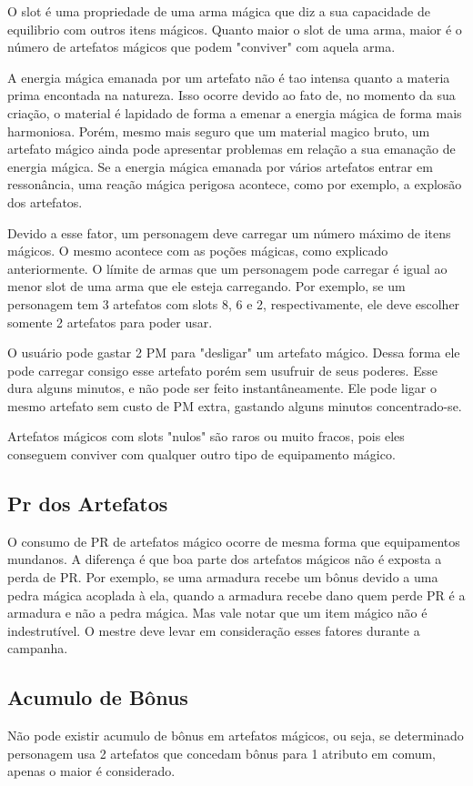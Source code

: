 O slot é uma propriedade de uma arma mágica que diz a sua capacidade de equilibrio com outros itens mágicos. Quanto maior o slot de uma arma, maior é o número de artefatos mágicos que podem "conviver" com aquela arma. 

A energia mágica emanada por um artefato não é tao intensa quanto a materia prima encontada na natureza. Isso ocorre devido ao fato de, no momento da sua criação, o material é lapidado de forma a emenar a energia mágica de forma mais harmoniosa. Porém, mesmo mais seguro que um material magico bruto, um artefato mágico ainda pode apresentar problemas em relação a sua emanação de energia mágica. Se a energia mágica emanada por vários artefatos entrar em ressonância, uma reação mágica perigosa acontece, como por exemplo, a explosão dos artefatos.

Devido a esse fator, um personagem deve carregar um número máximo de itens mágicos. O mesmo acontece com as poções mágicas, como explicado anteriormente. O límite de armas que um personagem pode carregar é igual ao menor slot de uma arma que ele esteja carregando. Por exemplo, se um personagem tem 3 artefatos com slots 8, 6 e 2, respectivamente, ele deve escolher somente 2 artefatos para poder usar.

O usuário pode gastar 2 PM para "desligar" um artefato mágico. Dessa forma ele pode carregar consigo esse artefato porém sem usufruir de seus poderes. Esse dura alguns minutos, e não pode ser feito instantâneamente. Ele pode ligar o mesmo artefato sem custo de PM extra, gastando alguns minutos concentrado-se.

Artefatos mágicos com slots "nulos" são raros ou muito fracos, pois eles conseguem conviver com qualquer outro tipo de equipamento mágico.

\subsection{Pr dos Artefatos}
O consumo de PR de artefatos mágico ocorre de mesma forma que equipamentos mundanos. A diferença é que boa parte dos artefatos mágicos não é exposta a perda de PR. Por exemplo, se uma armadura recebe um bônus devido a uma pedra mágica acoplada à ela, quando a armadura recebe dano quem perde PR é a armadura e não a pedra mágica. Mas vale notar que um item mágico não é indestrutível. O mestre deve levar em consideração esses fatores durante a campanha. 


\subsection{Acumulo de Bônus}
Não pode existir acumulo de bônus em artefatos mágicos, ou seja, se determinado personagem usa 2 artefatos que concedam bônus para 1 atributo em comum, apenas o maior é considerado.

